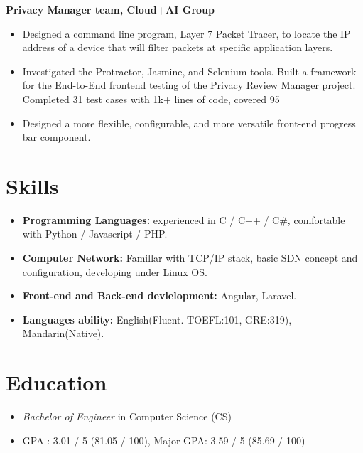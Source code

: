 \documentclass{resume}
\begin{document}
\textbf{Privacy Manager team, Cloud+AI Group}
\begin{itemize}
  \item Designed a command line program, Layer 7 Packet Tracer, to locate the IP address of a device that will filter packets at specific application layers.
  \item Investigated the Protractor, Jasmine, and Selenium tools. Built a framework for the End-to-End frontend testing of the Privacy Review Manager project. Completed 31 test cases with 1k+ lines of code, covered 95%
  \item Designed a more flexible, configurable, and more versatile front-end progress bar component.
\end{itemize}

\section{Skills}
\begin{itemize}[parsep=0.5ex]
  \item \textbf{Programming Languages:} experienced in C / C++ / C\#, comfortable with Python / Javascript / PHP.
  \item \textbf{Computer Network:} Famillar with TCP/IP stack, basic SDN concept and configuration, developing under Linux OS.
  \item \textbf{Front-end and Back-end devlelopment:} Angular, Laravel.
  \item \textbf{Languages ability:} English(Fluent. TOEFL:101, GRE:319), Mandarin(Native).
\end{itemize}

\section{Education}
\begin{itemize}
  \item \textit{Bachelor of Engineer} in Computer Science (CS)
  \item GPA : 3.01 / 5 (81.05 / 100), Major GPA: 3.59 / 5 (85.69 / 100)
\end{itemize}

%
%
\end{document}
